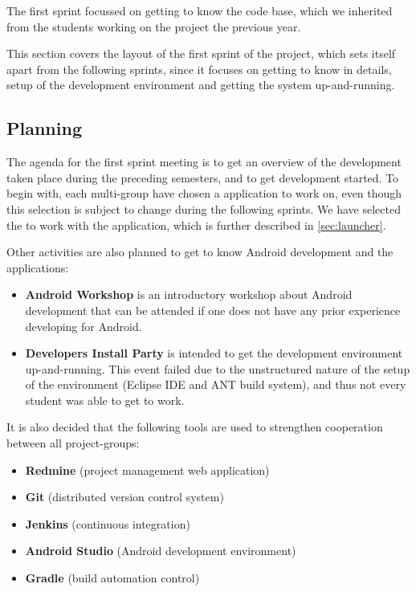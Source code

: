 The first sprint focussed on getting to know the \giraf code base, which we inherited from the students working on the project the previous year. 

This section covers the layout of the first sprint of the project, which sets itself apart from the following sprints, since it focuses on getting to know \giraf in details, setup of the development environment and getting the system up-and-running.

\subsection{Planning}\label{sec:sprint1:planning}
The agenda for the first sprint meeting is to get an overview of the development taken place during the preceding semesters, and to get development started.
To begin with, each multi-group have chosen a \giraf application to work on, even though this selection is subject to change during the following sprints.
We have selected the to work with the \launcher application, which is further described in \cref{sec:launcher}.

Other activities are also planned to get to know Android development and the \giraf applications:

\begin{itemize}
\item \textbf{Android Workshop}
is an introductory workshop about Android development that can be attended if one does not have any prior experience developing for Android.
\item \textbf{Developers Install Party} is intended to get the \giraf development environment up-and-running.
This event failed due to the unstructured nature of the setup of the environment (Eclipse IDE and ANT build system), and thus not every student was able to get \giraf to work.
\end{itemize}

It is also decided that the following tools are used to strengthen cooperation between all project-groups:

\begin{itemize}
\item \textbf{Redmine} (project management web application)
\item \textbf{Git} (distributed version control system)
\item \textbf{Jenkins} (continuous integration)
\item \textbf{Android Studio} (Android development environment)
\item \textbf{Gradle} (build automation control)
\end{itemize}

